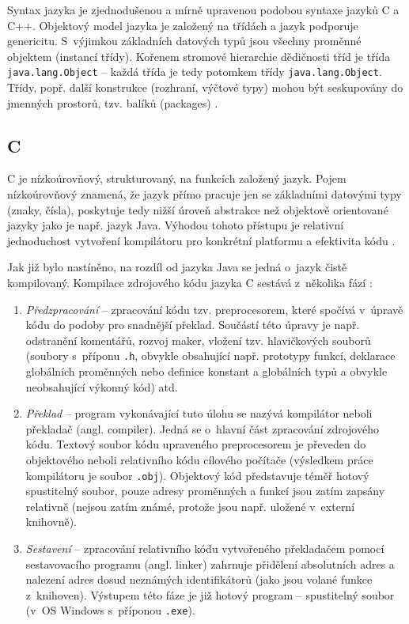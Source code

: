 \documentclass[onepage, a4paper, 12pt]{bakalarka}
\begin{document}
Syntax jazyka je zjednodušenou a mírně upravenou podobou syntaxe jazyků C a C++. Objektový model jazyka je založený na třídách a jazyk podporuje genericitu. S~výjimkou základních datových typů jsou všechny proměnné objektem (instancí třídy). Kořenem stromové hierarchie dědičnosti tříd je třída \texttt{java.lang.Object} – každá třída je tedy potomkem třídy \texttt{java.lang.Object}. Třídy, popř. další konstrukce (rozhraní, výčtové typy) mohou být seskupovány do jmenných prostorů, tzv. balíků (packages) \cite{java-book, java-guide-object}.\par

\subsection{C}
C je nízkoúrovňový, strukturovaný, na funkcích založený jazyk. Pojem nízkoúrovňový znamená, že jazyk přímo pracuje jen se základními datovými typy (znaky, čísla), poskytuje tedy nižší úroveň abstrakce než objektově orientované jazyky jako je např. jazyk Java. Výhodou tohoto přístupu je relativní jednoduchost vytvoření kompilátoru pro konkrétní platformu a efektivita kódu \cite{c-book, c-guide}.\par
Jak již bylo nastíněno, na rozdíl od jazyka Java se jedná o~jazyk čistě kompilovaný. Kompilace zdrojového kódu jazyka C sestává z~několika fází \cite{c-book, c-guide}:
\begin{enumerate}
\item \textit{Předzpracování} -- zpracování kódu tzv. preprocesorem, které spočívá v~úpravě kódu do podoby pro snadnější překlad. Součástí této úpravy je např. odstranění komentářů, rozvoj maker, vložení tzv. hlavičkových souborů (soubory s~příponu \texttt{.h}, obvykle obsahující např. prototypy funkcí, deklarace globálních proměnných nebo definice konstant a globálních typů a obvykle neobsahující výkonný kód) atd.
\item \textit{Překlad} -- program vykonávající tuto úlohu se nazývá kompilátor neboli překladač (angl. compiler). Jedná se o~hlavní část zpracování zdrojového kódu. Textový soubor kódu upraveného preprocesorem je převeden do objektového neboli relativního kódu cílového počítače (výsledkem práce kompilátoru je soubor \texttt{.obj}). Objektový kód představuje téměř hotový spustitelný soubor, pouze adresy proměnných a funkcí jsou zatím zapsány relativně (nejsou zatím známé, protože jsou např. uložené v~externí knihovně).
\item \textit{Sestavení} -- zpracování relativního kódu vytvořeného překladačem pomocí sestavovacího programu (angl. linker) zahrnuje přidělení absolutních adres a nalezení adres dosud neznámých identifikátorů (jako jsou volané funkce z~knihoven). Výstupem této fáze je již hotový program -- spustitelný soubor (v~OS Windows s~příponou \texttt{.exe}).
\end{enumerate}\par\noindent
\end{document}
